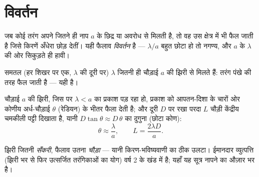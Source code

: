 \section{विवर्तन}

\begin{definition}[विवर्तन]\label{def:g12:light-as-wave:diffraction}
जब कोई तरंग अपने  जितने ही नाप $a$ के छिद्र या
अवरोध से मिलती है, तो वह उस क्षेत्र में भी फैल जाती है जिसे किरणें अँधेरा छोड़
देतीं। यही फैलाव \emph{विवर्तन} है --- $\lambda/a$ बहुत छोटा हो तो
नगण्य, और $a$ के $\lambda$ की ओर सिकुड़ते ही हावी।
\end{definition}

\begin{omfigure}

{\small समतल  (हर शिखर पर एक, $\lambda$ की दूरी पर) $\lambda$ जितनी
ही चौड़ाई $a$ की झिरी से मिलते हैं: तरंग पंखे की तरह फैल जाती है
--- यही  है।}
\end{omfigure}

\begin{proposition}[फैलाव की कोणीय अर्ध-चौड़ाई]\label{prop:g12:light-as-wave:halfwidth}
चौड़ाई $a$ की झिरी, जिस पर  $\lambda < a$ का प्रकाश पड़ रहा
हो, प्रकाश को आपतन-दिशा के चारों ओर कोणीय अर्ध-चौड़ाई $\theta$ (रेडियन) के भीतर
फैला देती है; और दूरी $D$ पर रखा परदा $L$ चौड़ी केंद्रीय चमकीली पट्टी
दिखाता है, यानी $D \tan\theta \approx D\,\theta$ का दुगुना (छोटा कोण):
\[
\theta \approx \frac{\lambda}{a}, \qquad L = \frac{2\lambda D}{a}.
\]
\end{proposition}
\admitted

\begin{remark}[सूत्र को उलटा पढ़िए]\label{rem:g12:light-as-wave:honest}
झिरी जितनी \emph{सँकरी}, फैलाव उतना \emph{चौड़ा} --- यानी किरण-भविष्यवाणी का
ठीक उलटा। ईमानदार व्युत्पत्ति (झिरी भर से फिर उत्सर्जित तरंगिकाओं का योग)
वर्ष 2 के खंड में है; यहाँ यह सूत्र नापने का औज़ार भर है।
\end{remark}

